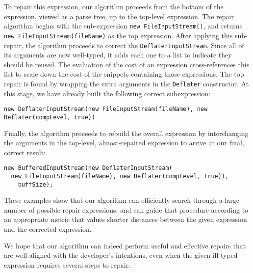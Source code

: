 To repair this expression, our algorithm proceeds from the bottom of the expression, viewed as a parse tree, up to the top-level expression. The repair algorithm begins with the sub-expression \lstinline{new FileInputStream()}, and returns \lstinline{new FileInputStream(fileName)} as the top expression. After applying this sub-repair, the algorithm proceeds to correct the \lstinline{DeflaterInputStream}. Since all of its arguments are now well-typed, it adds each one to a list to indicate they should be reused. The evaluation of the cost of an expression cross-references this list to scale down the cost of the snippets containing those expressions. The top repair is found by wrapping the extra arguments in the \lstinline{Deflater} constructor. At this stage, we have already built the following correct subexpression:
\begin{lstlisting}
new DeflaterInputStream(new FileInputStream(fileName), new Deflater(compLevel, true))
\end{lstlisting}
Finally, the algorithm proceeds to rebuild the overall expression by interchanging the arguments in the top-level, almost-repaired expression to arrive at our final, correct result:
\begin{lstlisting}   
new BufferedInputStream(new DeflaterInputStream(
  new FileInputStream(fileName), new Deflater(compLevel, true)),
    buffSize);
\end{lstlisting}
These examples show that our algorithm can efficiently search through a large number of possible repair expressions, and can guide that procedure according to an appropriate metric that values shorter distances between the given expression and the corrected expression.

We hope that our algorithm can indeed perform useful and effective repairs that are well-aligned with the developer's intentions, even when the given ill-typed expression requires several steps to repair.
